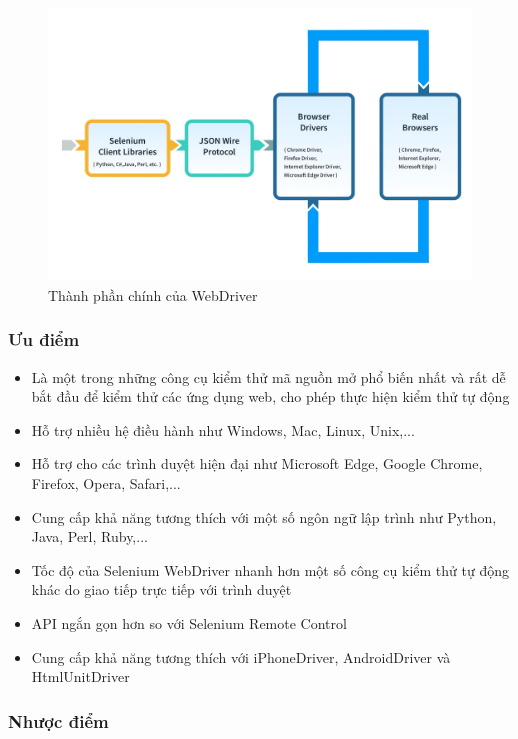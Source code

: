 \documentclass[./../main_file.tex]{subfiles}
\begin{document}
	\begin{figure}
		\includegraphics[width=\linewidth]{./images/image8.png}
		\caption{Thành phần chính của WebDriver}
	\end{figure}

	\subsubsection{Ưu điểm}
	
	\begin{itemize}
		\item Là một trong những công cụ kiểm thử mã nguồn mở phổ biến nhất và rất dễ bắt đầu để kiểm thử các ứng dụng web, cho phép thực hiện kiểm thử tự động
		\item Hỗ trợ nhiều hệ điều hành như Windows, Mac, Linux, Unix,...
		\item Hỗ trợ cho các trình duyệt hiện đại như Microsoft Edge, Google Chrome, Firefox, Opera, Safari,...
		\item Cung cấp khả năng tương thích với một số ngôn ngữ lập trình như Python, Java, Perl, Ruby,...
		\item Tốc độ của Selenium WebDriver nhanh hơn một số công cụ kiểm thử tự động khác do giao tiếp trực tiếp với trình duyệt
		\item API ngắn gọn hơn so với Selenium Remote Control
		\item Cung cấp khả năng tương thích với iPhoneDriver, AndroidDriver và HtmlUnitDriver
	\end{itemize}

	\subsubsection{Nhược điểm}
	
\end{document}
